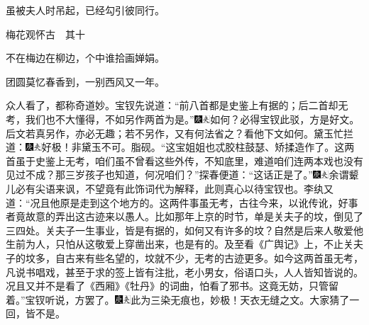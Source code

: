 虽被夫人时吊起，已经勾引彼同行。

梅花观怀古　其十

不在梅边在柳边，个中谁拾画婵娟。

团圆莫忆春香到，一别西风又一年。

众人看了，都称奇道妙。宝钗先说道：``前八首都是史鉴上有据的；后二首却无考，我们也不大懂得，不如另作两首为是。''{\includegraphics[width=3mm]{../Images/00004}\includegraphics[width=3mm]{../Images/00012}\footnotesize \kaishu 如何？必得宝钗此驳，方是好文。后文若真另作，亦必无趣；若不另作，又有何法省之？看他下文如何。}黛玉忙拦道：{\includegraphics[width=3mm]{../Images/00004}\includegraphics[width=3mm]{../Images/00012}\footnotesize \kaishu 好极！非黛玉不可。脂砚。}``这宝姐姐也忒胶柱鼓瑟、矫揉造作了。这两首虽于史鉴上无考，咱们虽不曾看这些外传，不知底里，难道咱们连两本戏也没有见过不成？那三岁孩子也知道，何况咱们？''探春便道：``这话正是了。''{\includegraphics[width=3mm]{../Images/00004}\includegraphics[width=3mm]{../Images/00012}\footnotesize \kaishu 余谓颦儿必有尖语来讽，不望竟有此饰词代为解释，此则真心以待宝钗也。}李纨又道：``况且他原是走到这个地方的。这两件事虽无考，古往今来，以讹传讹，好事者竟故意的弄出这古迹来以愚人。比如那年上京的时节，单是关夫子的坟，倒见了三四处。关夫子一生事业，皆是有据的，如何又有许多的坟？自然是后来人敬爱他生前为人，只怕从这敬爱上穿凿出来，也是有的。及至看《广舆记》上，不止关夫子的坟多，自古来有些名望的，坟就不少，无考的古迹更多。如今这两首虽无考，凡说书唱戏，甚至于求的签上皆有注批，老小男女，俗语口头，人人皆知皆说的。况且又并不是看了《西厢》《牡丹》的词曲，怕看了邪书。这竟无妨，只管留着。''宝钗听说，方罢了。{\includegraphics[width=3mm]{../Images/00004}\includegraphics[width=3mm]{../Images/00012}\footnotesize \kaishu 此为三染无痕也，妙极！天衣无缝之文。}大家猜了一回，皆不是。

